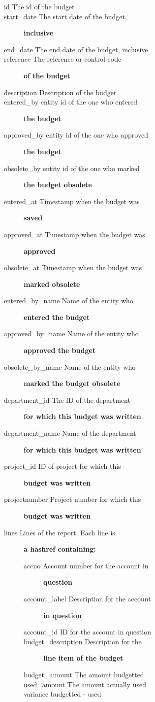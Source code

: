\begin{description}
\begin{description}
\item[{id
The id of the budget}] \mbox{}
\item[{start\_date The start date of the budget,}] \textbf{inclusive}
\item[{end\_date The end date of the budget, inclusive}] \mbox{}
\item[{reference The reference or control code}] \textbf{of the budget}
\item[{description
Description of the budget}] \mbox{}
\item[{entered\_by entity id of the one who entered}] \textbf{the budget}
\item[{approved\_by entity id of the one who approved}] \textbf{the budget}
\item[{obsolete\_by entity id of the one who marked}] \textbf{the budget obsolete}
\item[{entered\_at Timestamp when the budget was}] \textbf{saved}
\item[{approved\_at Timestamp when the budget was}] \textbf{approved}
\item[{obsolete\_at Timestamp when the budget was}] \textbf{marked obsolete}
\item[{entered\_by\_name Name of the entity who}] \textbf{entered the budget}
\item[{approved\_by\_name Name of the entity who}] \textbf{approved the budget}
\item[{obsolete\_by\_name Name of the entity who}] \textbf{marked the budget obsolete}
\item[{department\_id The ID of the department}] \textbf{for which this budget was written}
\item[{department\_name Name of the department}] \textbf{for which this budget was written}
\item[{project\_id ID of project for which this}] \textbf{budget was written}
\item[{projectnumber Project number for which this}] \textbf{budget was written}
\item[{lines Lines of the report. Each line is}] \textbf{a hashref containing:}\begin{description}

\item[{accno Account number for the account in}] \textbf{question}
\item[{account\_label Description for the account}] \textbf{in question}
\item[{account\_id ID for the account in question}] \mbox{}
\item[{budget\_description Description for the}] \textbf{line item of the budget}
\item[{budget\_amount
The amount budgetted}] \mbox{}
\item[{used\_amount
The amount actually used}] \mbox{}
\item[{variance
budgetted - used}] \mbox{}\end{description}
\end{description}

\end{description}
